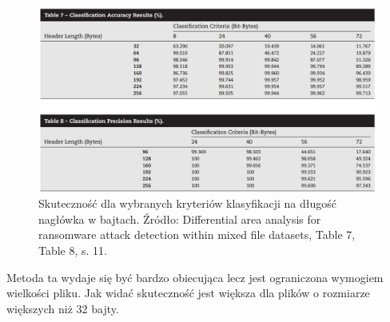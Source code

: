 \begin{figure}[H]
    \centering
    \includegraphics[width=0.85\linewidth]{rysunki/wycinek.png}
    \caption{Skuteczność dla wybranych kryteriów klasyfikacji na długość nagłówka w bajtach. Źródło: Differential area analysis for ransomware
    attack detection within mixed file datasets, Table 7, Table 8, s. 11.}
    \label{fig:enter-label}
\end{figure}
Metoda ta wydaje się być bardzo obiecująca lecz jest ograniczona wymogiem wielkości pliku. Jak widać skuteczność jest większa dla plików o rozmiarze większych niż 32 bajty.
